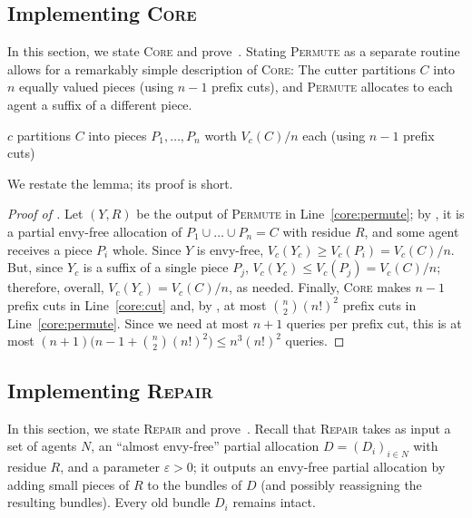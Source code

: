 \documentclass[11pt]{article}
\newcommand{\eps}{\varepsilon}
\newcommand{\Core}{\textsc{Core}}
\newcommand{\Repair}{\textsc{Repair}}
\newcommand{\Permute}{\textsc{Permute}}
\theoremstyle{plain}
\theoremstyle{definition}
\theoremstyle{plain}
\begin{document}
\subsection{Implementing \Core}

In this section, we state \Core{} and prove~. Stating \Permute{} as a separate routine allows for a remarkably simple description of \Core{}: The cutter partitions $C$ into $n$ equally valued pieces (using $n-1$ prefix cuts), and \Permute{} allocates to each agent a suffix of a different piece.

\begin{algorithm}[H]
\caption{$\Core(c,N,C)$, where $n=|N|$}\label{alg:core}
$c$ partitions $C$ into pieces $P_1,\dots,P_n$ worth $V_c(C)/n$ each (using $n-1$ prefix cuts) \;\label{core:cut}
\Return{$\Permute(N,(P_i)_{i \in N})$}\;\label{core:permute}
\end{algorithm}

We restate the lemma; its proof is short.

\coremain*

\begin{proof}[Proof of ]
Let $(Y,R)$ be the output of \Permute{} in Line~\ref{core:permute}; by , it is a partial envy-free allocation of $P_1\cup\dots\cup P_n=C$ with residue $R$, and some agent receives a piece $P_i$ whole. Since $Y$ is envy-free, $V_c(Y_c)\ge V_c(P_i)=V_c(C)/n$. But, since $Y_c$ is a suffix of a single piece $P_{j}$, $V_c(Y_c)\le V_c(P_{j}) = V_c(C)/n$; therefore, overall, $V_c(Y_c) = V_c(C)/n$, as needed. Finally, \Core{} makes $n-1$ prefix cuts in Line~\ref{core:cut} and, by , at most $\binom n2(n!)^2$ prefix cuts in Line~\ref{core:permute}. Since we need at most $n+1$ queries per prefix cut, this is at most $(n+1)\bigl(n-1+\binom n2(n!)^2\bigr)\le n^3(n!)^2$ queries.
\end{proof}

\subsection{Implementing \Repair}


In this section, we state \Repair{} and prove~. Recall that \Repair{} takes as input a set of agents $N$, an ``almost envy-free'' partial allocation $D=(D_i)_{i\in N}$ with residue $R$, and a parameter $\eps>0$; it outputs an envy-free partial allocation by adding small pieces of $R$ to the bundles of $D$ (and possibly reassigning the resulting bundles). Every old bundle $D_i$ remains intact. 
\end{document}
